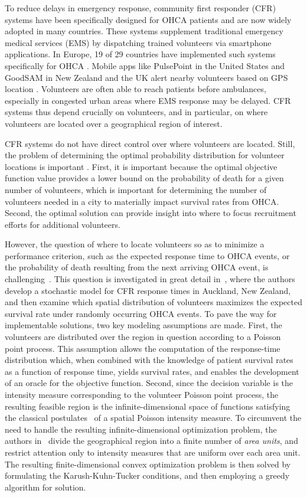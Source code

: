\documentclass[stsy,sglanonrev]{informs4}
\begin{document}
To reduce delays in emergency response, community first responder (CFR) systems have been specifically designed for OHCA patients and are now widely adopted in many countries. These systems supplement traditional emergency medical services (EMS) by dispatching trained volunteers via smartphone applications. In Europe, 19 of 29 countries have implemented such systems specifically for OHCA \cite{oving2019first}. Mobile apps like PulsePoint in the United States \cite{pulsepoint2020} and GoodSAM in New Zealand and the UK alert nearby volunteers based on GPS location \cite{goodsam2020}. Volunteers are often able to reach patients before ambulances, especially in congested urban areas where EMS response may be delayed. CFR systems thus depend crucially on volunteers, and in particular, on where volunteers are located over a geographical region of interest. 

CFR systems do not have direct control over where volunteers are located. Still, the problem of determining the optimal probability distribution for volunteer locations is important \cite{van2024modeling}. First, it is important because the optimal objective function value provides a lower bound on the probability of death for a given number of volunteers, which is important for determining the number of volunteers needed in a city to materially impact survival rates from OHCA. Second, the optimal solution can provide insight into where to focus recruitment efforts for additional volunteers.

However, the question of where to locate volunteers so as to minimize a performance criterion, such as the expected response time to OHCA events, or the probability of death resulting from the next arriving OHCA event, is challenging~\cite{van2024modeling,waalewijn2001survival}. This question is investigated in great detail in~\cite{van2024modeling}, where the authors develop a stochastic model for CFR response times in Auckland, New Zealand, and then examine which spatial distribution of volunteers maximizes the expected survival rate under randomly occurring OHCA events. To pave the way for implementable solutions, two key modeling assumptions are made. First, the volunteers are distributed over the region in question according to a Poisson point process. This assumption allows the computation of the response-time distribution which, when combined with the knowledge of patient survival rates as a function of response time, yields survival rates, and enables the development of an oracle for the objective function. Second, since the decision variable is the intensity measure corresponding to the volunteer Poisson point process, the resulting feasible region is the infinite-dimensional space of functions satisfying the classical postulates~\cite{1992res} of a spatial Poisson intensity measure. To circumvent the need to handle the resulting infinite-dimensional optimization problem, the authors in~\cite{van2024modeling} divide the geographical region into a finite number of \emph{area units}, and restrict attention only to intensity measures that are uniform over each area unit. The resulting finite-dimensional convex optimization problem is then solved by formulating the Karush-Kuhn-Tucker conditions, and then employing a greedy algorithm for solution.   
\end{document}
